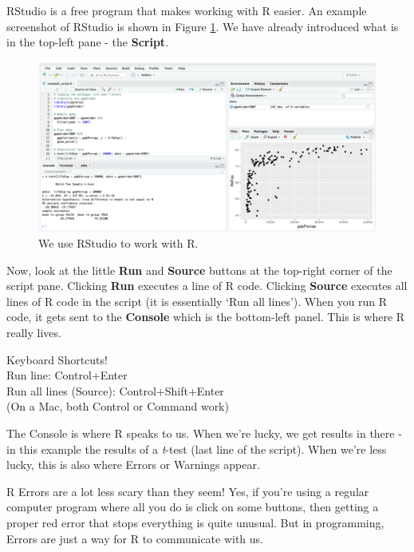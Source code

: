 \documentclass[
  12pt,
  krantz2]{krantz}
\renewenvironment{quote}{\begin{VF}}{\end{VF}}
\begin{document}

RStudio is a free program that makes working with R easier.
An example screenshot of RStudio is shown in Figure \ref{fig:chap01-fig-rstudio}.
We have already introduced what is in the top-left pane - the \textbf{Script}.

\begin{figure}
\includegraphics[width=1\linewidth]{images/chapter01/rstudio_interface} \caption{We use RStudio to work with R.}\label{fig:chap01-fig-rstudio}
\end{figure}

Now, look at the little \textbf{Run} and \textbf{Source} buttons at the top-right corner of the script pane.
Clicking \textbf{Run} executes a line of R code.
Clicking \textbf{Source} executes all lines of R code in the script (it is essentially `Run all lines').
When you run R code, it gets sent to the \textbf{Console} which is the bottom-left panel.
This is where R really lives.

\begin{quote}
Keyboard Shortcuts!\\
Run line: Control+Enter\\
Run all lines (Source): Control+Shift+Enter\\
(On a Mac, both Control or Command work)
\end{quote}

The Console is where R speaks to us.
When we're lucky, we get results in there - in this example the results of a \emph{t}-test (last line of the script).
When we're less lucky, this is also where Errors or Warnings appear.

R Errors are a lot less scary than they seem!
Yes, if you're using a regular computer program where all you do is click on some buttons, then getting a proper red error that stops everything is quite unusual.
But in programming, Errors are just a way for R to communicate with us.
\end{document}
